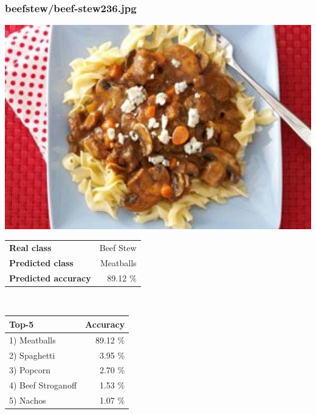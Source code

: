 \subsubsection{beef\textunderscore stew/beef-stew236.jpg}

\begin{minipage}[t]{0.4\textwidth}
	\vspace{0pt}
	\includegraphics[width=\linewidth]{images/evaluation-images/beef_stew/beef-stew236.jpg}
\end{minipage}
\hfill
\begin{minipage}[t]{0.5\textwidth}
	\vspace{0pt}\raggedright
	\begin{tabularx}{\textwidth}{X r}
		\small \textbf{Real class} & \small Beef Stew\\
		\small \textbf{Predicted class} & \small Meatballs\\
		\small \textbf{Predicted accuracy} & \small 89.12 \%
    \end{tabularx}\\
    
    \vspace{6pt}
	\begin{tabularx}{\textwidth}{X r}
        \small \textbf{Top-5} & \small \textbf{Accuracy} \\
        \hline
		\small 1) Meatballs & \small 89.12 \%\\\small 2) Spaghetti & \small 3.95 \%\\\small 3) Popcorn & \small 2.70 \%\\\small 4) Beef Stroganoff & \small 1.53 \%\\\small 5) Nachos & \small 1.07 \%
    \end{tabularx}
\end{minipage}
    

